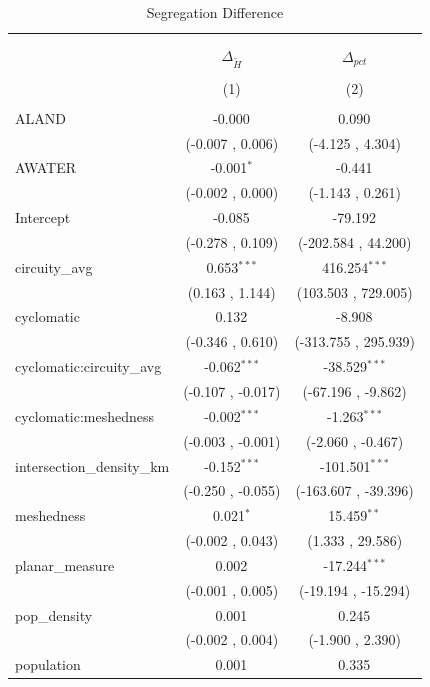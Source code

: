 \documentclass[
  10pt,
]{article}
\begin{document}
\begin{table}[!htbp] \centering
  \caption{Segregation Difference}
\begin{tabular}{@{\extracolsep{5pt}}lcc}
\\[-1.8ex]\hline
\hline \\[-1.8ex]
\\[-1.8ex] & \multicolumn{1}{c}{$\Delta_{\tilde{H}}$} & \multicolumn{1}{c}{$\Delta_{pct}$}  \\
\\[-1.8ex] & (1) & (2) \\
\hline \\[-1.8ex]
 ALAND & -0.000$^{}$ & 0.090$^{}$ \\
  & (-0.007 , 0.006) & (-4.125 , 4.304) \\
 AWATER & -0.001$^{*}$ & -0.441$^{}$ \\
  & (-0.002 , 0.000) & (-1.143 , 0.261) \\
 Intercept & -0.085$^{}$ & -79.192$^{}$ \\
  & (-0.278 , 0.109) & (-202.584 , 44.200) \\
 circuity\_avg & 0.653$^{***}$ & 416.254$^{***}$ \\
  & (0.163 , 1.144) & (103.503 , 729.005) \\
 cyclomatic & 0.132$^{}$ & -8.908$^{}$ \\
  & (-0.346 , 0.610) & (-313.755 , 295.939) \\
 cyclomatic:circuity\_avg & -0.062$^{***}$ & -38.529$^{***}$ \\
  & (-0.107 , -0.017) & (-67.196 , -9.862) \\
 cyclomatic:meshedness & -0.002$^{***}$ & -1.263$^{***}$ \\
  & (-0.003 , -0.001) & (-2.060 , -0.467) \\
 intersection\_density\_km & -0.152$^{***}$ & -101.501$^{***}$ \\
  & (-0.250 , -0.055) & (-163.607 , -39.396) \\
 meshedness & 0.021$^{*}$ & 15.459$^{**}$ \\
  & (-0.002 , 0.043) & (1.333 , 29.586) \\
 planar\_measure & 0.002$^{}$ & -17.244$^{***}$ \\
  & (-0.001 , 0.005) & (-19.194 , -15.294) \\
 pop\_density & 0.001$^{}$ & 0.245$^{}$ \\
  & (-0.002 , 0.004) & (-1.900 , 2.390) \\
 population & 0.001$^{}$ & 0.335$^{}$ \\

\end{tabular}
\end{table}
\end{document}
